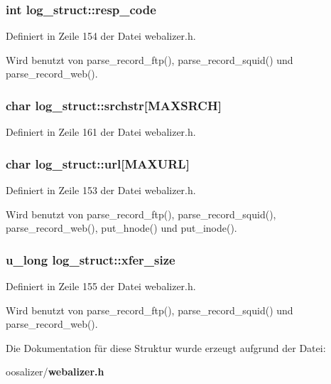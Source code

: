 \subsubsection{\setlength{\rightskip}{0pt plus 5cm}int {\bf log\_\-struct::resp\_\-code}}\label{structlog__struct_b8db9826a57acc82a4c7d99948a9b89c}




Definiert in Zeile 154 der Datei webalizer.h.

Wird benutzt von parse\_\-record\_\-ftp(), parse\_\-record\_\-squid() und parse\_\-record\_\-web().
\subsubsection{\setlength{\rightskip}{0pt plus 5cm}char {\bf log\_\-struct::srchstr}[MAXSRCH]}\label{structlog__struct_56f5b706fac667b9d9309ad128e5a102}




Definiert in Zeile 161 der Datei webalizer.h.
\subsubsection{\setlength{\rightskip}{0pt plus 5cm}char {\bf log\_\-struct::url}[MAXURL]}\label{structlog__struct_479e09f2dc389f8a0a57b9c3146d9d32}




Definiert in Zeile 153 der Datei webalizer.h.

Wird benutzt von parse\_\-record\_\-ftp(), parse\_\-record\_\-squid(), parse\_\-record\_\-web(), put\_\-hnode() und put\_\-inode().
\subsubsection{\setlength{\rightskip}{0pt plus 5cm}u\_\-long {\bf log\_\-struct::xfer\_\-size}}\label{structlog__struct_8147dacfe44060fa40bb3caf79e3fdd1}




Definiert in Zeile 155 der Datei webalizer.h.

Wird benutzt von parse\_\-record\_\-ftp(), parse\_\-record\_\-squid() und parse\_\-record\_\-web().

Die Dokumentation f\"{u}r diese Struktur wurde erzeugt aufgrund der Datei:\begin{CompactItemize}
\item 
oosalizer/{\bf webalizer.h}\end{CompactItemize}
